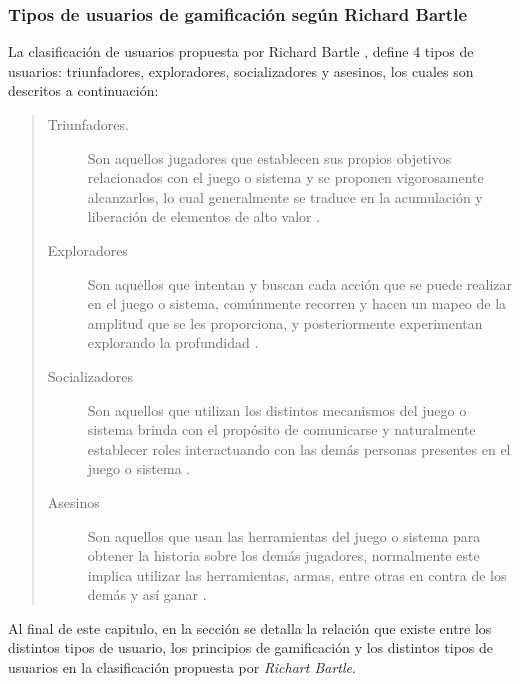 \subsubsection{Tipos de usuarios de gamificación según Richard Bartle}

 La clasificación de usuarios propuesta por Richard Bartle \cite{BartleUsuarios},
 define 4 tipos de usuarios: triunfadores, exploradores, socializadores y asesinos,
 los cuales son descritos a continuación:

    \begin{quote}
    \begin{description}
    \item[Triunfadores.]
        Son aquellos jugadores que establecen sus propios objetivos relacionados con
        el juego o sistema y se proponen vigorosamente alcanzarlos, lo cual
        generalmente se traduce en la acumulación y liberación de elementos de alto
        valor \cite[p. 3]{BartleUsuarios}.

    \item[Exploradores]
        Son aquellos que intentan y buscan cada acción que se puede realizar en el
        juego o sistema, comúnmente recorren y hacen un mapeo de la amplitud que se
        les proporciona, y posteriormente experimentan explorando la profundidad
        \cite[p. 4]{BartleUsuarios}.

    \item[Socializadores]
        Son aquellos que utilizan los distintos mecanismos del juego o sistema brinda
        con el propósito de comunicarse y naturalmente establecer roles interactuando
        con las demás personas presentes en el juego o sistema
        \cite[p. 4]{BartleUsuarios}.

    \item[Asesinos]
        Son aquellos que usan las herramientas del juego o sistema para obtener la
        historia sobre los demás jugadores, normalmente este implica utilizar las
        herramientas, armas, entre otras en contra de los demás y así ganar
        \cite[p. 4]{BartleUsuarios}.
    \end{description}
    \end{quote}

 \noindent
 Al final de este capitulo, en la sección  se detalla
 la relación que existe entre los distintos tipos de usuario, los principios de
 gamificación y los distintos tipos de usuarios en la clasificación propuesta por
 {\it Richart Bartle}.


